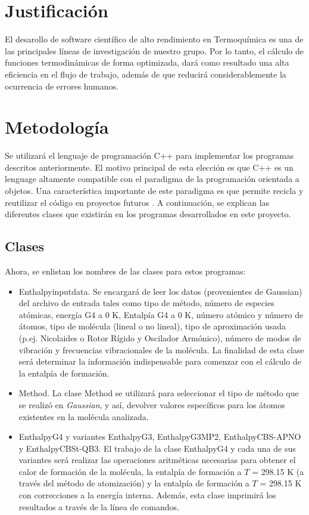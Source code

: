 \documentclass[12pt]{article}
\begin{document}
\section*{Justificación}
El desarollo de software científico de alto rendimiento en Termoquímica es una de
las principales líneas de investigación de nuestro grupo. Por lo tanto, el cálculo
de funciones termodinámicas de forma optimizada, dará como resultado una alta
eficiencia en el flujo de trabajo, además de que
reducirá considerablemente la ocurrencia de errores humanos. 


\section*{Metodología}
Se utilizará el lenguaje de programación C++ para implementar los programas descritos anteriormente. El motivo principal de esta elección es que C++ es un lenguage altamente compatible con el
paradigma de la programación orientada a objetos. Una característica importante de este paradigma
es que permite recicla y reutilizar el código en proyectos futuros \cite{cplusplus}. A continuación, se explican las diferentes clases que existirán en los programas desarrollados en este proyecto.

\subsection*{Clases}
Ahora, se enlistan los nombres de las clases para estos programas:
\begin{itemize}
	\item Enthalpyinputdata. Se encargará de leer los datos (provenientes de Gaussian) del archivo de entrada tales como tipo de método, número de especies atómicas, energía G4 a 0 K, Entalpía G4 a 0 K,
	número atómico y número de átomos, tipo de molécula (lineal o no lineal), tipo de
	aproximación usada (p.ej. Nicolaides o Rotor Rígido y Oscilador Armónico), número de
	modos de vibración y frecuencias vibracionales de la molécula. La finalidad de esta clase
	será determinar la información indispensable para comenzar con el cálculo de la
	entalpía de formación.
	\item Method. La clase Method se utilizará para seleccionar el tipo de método que
	se realizó en \textit{Gaussian}, y así, devolver valores específicos
	para los átomos existentes en la molécula analizada.
	\item EnthalpyG4 y variantes EnthalpyG3, EnthalpyG3MP2, EnthalpyCBS-APNO y
	\-Ent\-halp\-y\-CBSt-QB3.
	El trabajo de la clase EnthalpyG4 y cada una de sus variantes será realizar las operaciones 
	aritméticas necesarias para obtener el calor de formación de la  molécula,
	la entalpía de formación a
	$T$ = 298.15 K (a través del método de atomización) y la entalpía de formación a
	$T$ = 298.15 K con correcciones a la energía interna.
	Además, esta clase imprimirá los resultados a través de la línea de comandos.
\end{itemize}
\end{document}
